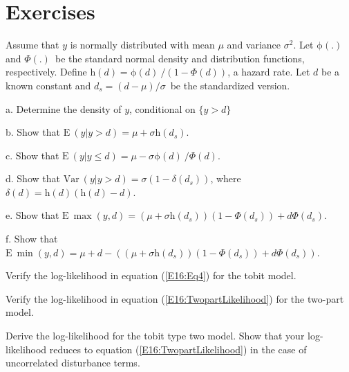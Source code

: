 \bigskip

\section{Exercises}

\begin{exercises}


\item Assume that $y$ is normally distributed with mean $\mu$
and variance $\sigma^2$. Let $\mathrm{\phi (.)}$ and $\Phi (.)$\ be
the standard normal density and distribution functions,
respectively. Define $\mathrm{h} (d) = \mathrm{\phi}(d)\ \mathrm{/}
\left( 1-\Phi (d)\right) $, a hazard rate. Let $d$ be a known
constant and $d_s=(d-\mu )/\sigma $\ be the standardized version.

a. Determine the density of $y$, conditional on $\{y>d\}$

b. Show that $\mathrm{E\ }\left( y|y>d\right) = \mu + \sigma
\mathrm{h}( d_s).$

c. Show that $\mathrm{E\ }\left( y|y\leq d\right) =\mu -\sigma
\mathrm{\phi}(d)\ \mathrm{/} \Phi (d).$

d. Show that $\mathrm{Var\ }\left( y|y>d\right) =\sigma \left(
1-\delta \left( d_s\right) \right) $, where $\delta \left( d\right)
=\mathrm{h} \left( d\right) \left( \mathrm{h} \left( d\right)
-d\right) .$

e. Show that $\mathrm{E\ }\max \left( y,d\right) =\left( \mu +\sigma
\mathrm{h} \left( d_s\right) \right) \left( 1-\Phi (d_s)\right)
+d\Phi (d_s).$

f. Show that $\mathrm{E~\min }\left( y,d\right) =\mu +d-\left(
\left( \mu +\sigma \mathrm{h} \left( d_s\right) \right) \left(
1-\Phi (d_s)\right) +d\Phi (d_s)\right) .$


\item Verify the log-likelihood in equation (\ref{E16:Eq4}) for the
tobit model.


\item  Verify the log-likelihood in equation
(\ref{E16:TwopartLikelihood}) for the two-part model.

\item Derive the log-likelihood for the tobit type two model. Show
that your log-likelihood reduces to equation
(\ref{E16:TwopartLikelihood}) in the case of uncorrelated
disturbance terms.

\end{exercises}
